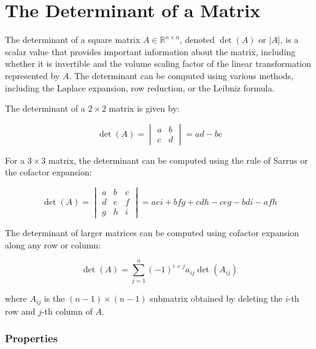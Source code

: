 \newpage
\section{The Determinant of a Matrix}

The determinant of a square matrix \(A \in \mathbb{R}^{n \times n}\), denoted \(\det(A)\) or \(|A|\), is a 
scalar value that provides important information about the matrix, including whether it is 
invertible and the volume scaling factor of the linear transformation represented by \(A\).
The determinant can be computed using various methods, including the Laplace 
expansion, row reduction, or the Leibniz formula.

The determinant of a \(2 \times 2\) matrix is given by:

\begin{equation*}
\det(A) =
\begin{vmatrix}
a & b \\
c & d
\end{vmatrix}
= ad - bc
\end{equation*}

For a \(3 \times 3\) matrix, the determinant can be computed using the rule of Sarrus or the cofactor expansion:

\begin{equation*}
\det(A) =
\begin{vmatrix}
a & b & c \\
d & e & f \\
g & h & i
\end{vmatrix}
= aei + bfg + cdh - ceg - bdi - afh
\end{equation*}

The determinant of larger matrices can be computed using cofactor expansion along any row or column:

\begin{equation*}
\det(A) = \sum_{j=1}^{n} (-1)^{i+j} a_{ij} \det(A_{ij})
\end{equation*}

where \(A_{ij}\) is the \((n-1) \times (n-1)\) submatrix obtained by deleting the \(i\)-th row and \(j\)-th column of \(A\).

\subsubsection{Properties}

